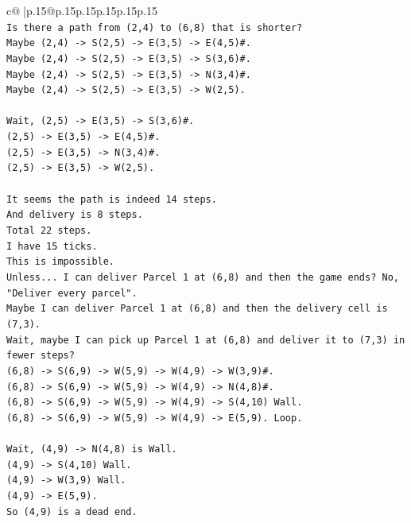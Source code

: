 \documentclass{article}
\begin{document}
{\begin{supertabular}{c@{$\;$}|p{.15\linewidth}@{}p{.15\linewidth}p{.15\linewidth}p{.15\linewidth}p{.15\linewidth}p{.15\linewidth}}
{{{\\ 
\texttt{Is there a path from (2,4) to (6,8) that is shorter?} \\
\texttt{Maybe (2,4) {-}> S(2,5) {-}> E(3,5) {-}> E(4,5)\#.} \\
\texttt{Maybe (2,4) {-}> S(2,5) {-}> E(3,5) {-}> S(3,6)\#.} \\
\texttt{Maybe (2,4) {-}> S(2,5) {-}> E(3,5) {-}> N(3,4)\#.} \\
\texttt{Maybe (2,4) {-}> S(2,5) {-}> E(3,5) {-}> W(2,5).} \\
\\ 
\texttt{Wait, (2,5) {-}> E(3,5) {-}> S(3,6)\#.} \\
\texttt{(2,5) {-}> E(3,5) {-}> E(4,5)\#.} \\
\texttt{(2,5) {-}> E(3,5) {-}> N(3,4)\#.} \\
\texttt{(2,5) {-}> E(3,5) {-}> W(2,5).} \\
\\ 
\texttt{It seems the path is indeed 14 steps.} \\
\texttt{And delivery is 8 steps.} \\
\texttt{Total 22 steps.} \\
\texttt{I have 15 ticks.} \\
\texttt{This is impossible.} \\
\texttt{Unless... I can deliver Parcel 1 at (6,8) and then the game ends? No, "Deliver every parcel".} \\
\texttt{Maybe I can deliver Parcel 1 at (6,8) and then the delivery cell is (7,3).} \\
\texttt{Wait, maybe I can pick up Parcel 1 at (6,8) and deliver it to (7,3) in fewer steps?} \\
\texttt{(6,8) {-}> S(6,9) {-}> W(5,9) {-}> W(4,9) {-}> W(3,9)\#.} \\
\texttt{(6,8) {-}> S(6,9) {-}> W(5,9) {-}> W(4,9) {-}> N(4,8)\#.} \\
\texttt{(6,8) {-}> S(6,9) {-}> W(5,9) {-}> W(4,9) {-}> S(4,10) Wall.} \\
\texttt{(6,8) {-}> S(6,9) {-}> W(5,9) {-}> W(4,9) {-}> E(5,9). Loop.} \\
\\ 
\texttt{Wait, (4,9) {-}> N(4,8) is Wall.} \\
\texttt{(4,9) {-}> S(4,10) Wall.} \\
\texttt{(4,9) {-}> W(3,9) Wall.} \\
\texttt{(4,9) {-}> E(5,9).} \\
\texttt{So (4,9) is a dead end.} \\
}}}
\end{supertabular}}
\end{document}
